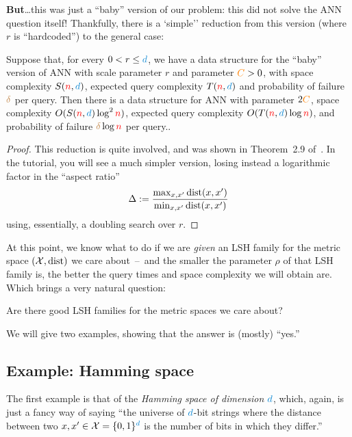 \textbf{But}\dots this was just a ``baby'' version of our problem: this did not solve the ANN question itself! Thankfully, there is a `simple'' reduction from this version (where $r$ is ``hardcoded'') to the general case:
\begin{theorem}
    Suppose that, for every $0 < r\leq \dims$, we have a data structure for the ``baby'' version of ANN with scale parameter $r$ and parameter $\textcolor{orange}{C}>0$, with space complexity $S(\ns,\dims)$, expected query complexity $T(\ns,\dims)$ and probability of failure ${\textcolor{brown}{\delta}}$ per query. Then there is a data structure for ANN with parameter $2\textcolor{orange}{C}$, space complexity $O(S(\ns,\dims)\log^2\ns)$, expected query complexity $O(T(\ns,\dims)\log\ns)$, and probability of failure ${\textcolor{brown}{\delta}}\log{\textcolor{red}{n}}$ per query..
\end{theorem}
\begin{proof}
    This reduction is quite involved, and was shown in Theorem~2.9 of~\cite{HarPeledIM12}. In the tutorial, you will see a much simpler version, losing instead a logarithmic factor in the ``aspect ratio''
    \[
        \Delta \eqdef \frac{\max_{x,x'} \dist{x}{x'}}{\min_{x,x'} \dist{x}{x'}}
    \]
    using, essentially, a doubling search over $r$.
\end{proof}
At this point, we know what to do if we are \emph{given} an LSH family for the metric space $(\mathcal{X},\operatorname{dist})$ we care about~--~and the smaller the parameter $\rho$ of that LSH family is, the better the query times and space complexity we will obtain are. Which brings a very natural question:
\begin{framed}
   \noindent Are there good  LSH families for the metric spaces we care about?
\end{framed}
\noindent We will give two examples, showing that the answer is (mostly) ``yes.''
\subsection{Example: Hamming space}
The first example is that of the \emph{Hamming space of dimension $\dims$}, which, again, is just a fancy way of saying ``the universe of $\dims$-bit strings where the distance between two $x,x'\in \cX = \bool^\dims$ is the number of bits in which they differ.''

